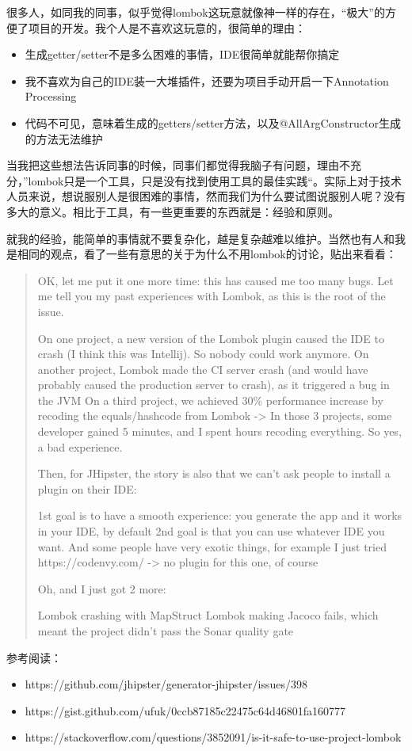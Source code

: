 \documentclass[12pt]{article}
\begin{document}
\makeblogtitle

很多人，如同我的同事，似乎觉得lombok这玩意就像神一样的存在，``极大''的方便了项目的开发。我个人是不喜欢这玩意的，很简单的理由：

\begin{itemize}
\tightlist
\item
  生成getter/setter不是多么困难的事情，IDE很简单就能帮你搞定
\item
  我不喜欢为自己的IDE装一大堆插件，还要为项目手动开启一下Annotation Processing
\item
  代码不可见，意味着生成的getters/setter方法，以及@AllArgConstructor生成的方法无法维护
\end{itemize}

当我把这些想法告诉同事的时候，同事们都觉得我脑子有问题，理由不充分，''lombok只是一个工具，只是没有找到使用工具的最佳实践``。实际上对于技术人员来说，想说服别人是很困难的事情，然而我们为什么要试图说服别人呢？没有多大的意义。相比于工具，有一些更重要的东西就是：经验和原则。

就我的经验，能简单的事情就不要复杂化，越是复杂越难以维护。当然也有人和我是相同的观点，看了一些有意思的关于为什么不用lombok的讨论，贴出来看看：

\begin{quote}
OK, let me put it one more time: this has caused me too many bugs. Let me tell you my past experiences with Lombok, as this is the root of the issue.

On one project, a new version of the Lombok plugin caused the IDE to crash (I think this was Intellij). So nobody could work anymore. On another project, Lombok made the CI server crash (and would have probably caused the production server to crash), as it triggered a bug in the JVM On a third project, we achieved 30\% performance increase by recoding the equals/hashcode from Lombok -\textgreater{} In those 3 projects, some developer gained 5 minutes, and I spent hours recoding everything. So yes, a bad experience.

Then, for JHipster, the story is also that we can't ask people to install a plugin on their IDE:

1st goal is to have a smooth experience: you generate the app and it works in your IDE, by default 2nd goal is that you can use whatever IDE you want. And some people have very exotic things, for example I just tried https://codenvy.com/ -\textgreater{} no plugin for this one, of course

Oh, and I just got 2 more:

Lombok crashing with MapStruct Lombok making Jacoco fails, which meant the project didn't pass the Sonar quality gate
\end{quote}

参考阅读：

\begin{itemize}
\tightlist
\item
  https://github.com/jhipster/generator-jhipster/issues/398
\item
  https://gist.github.com/ufuk/0ccb87185c22475c64d46801fa160777
\item
  https://stackoverflow.com/questions/3852091/is-it-safe-to-use-project-lombok
\end{itemize}
\end{document}
